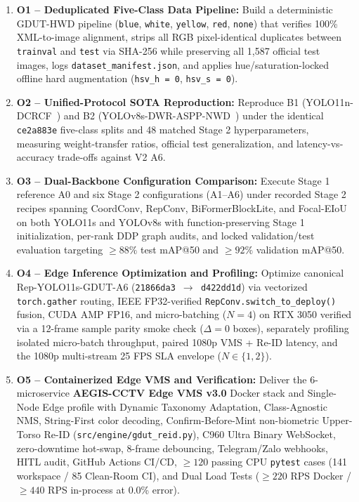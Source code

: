 \begin{enumerate}[leftmargin=1.9em, itemsep=2.5pt]
  \item \textbf{O1 -- Deduplicated Five-Class Data Pipeline:} Build a deterministic GDUT-HWD pipeline (\texttt{blue}, \texttt{white}, \texttt{yellow}, \texttt{red}, \texttt{none}) that verifies 100\% XML-to-image alignment, strips all RGB pixel-identical duplicates between \texttt{trainval} and \texttt{test} via SHA-256 while preserving all 1,587 official test images, logs \nolinkurl{dataset_manifest.json}, and applies hue/saturation-locked offline hard augmentation (\texttt{hsv\_h = 0}, \texttt{hsv\_s = 0}).
  \item \textbf{O2 -- Unified-Protocol SOTA Reproduction:} Reproduce B1 (YOLO11n-DCRCF~\cite{zhao2025yolodcrcf}) and B2 (YOLOv8s-DWR-ASPP-NWD~\cite{song2024improved}) under the identical \texttt{ce2a883e} five-class splits and 48 matched Stage 2 hyperparameters, measuring weight-transfer ratios, official test generalization, and latency-vs-accuracy trade-offs against V2 A6.
  \item \textbf{O3 -- Dual-Backbone Configuration Comparison:} Execute Stage 1 reference A0 and six Stage 2 configurations (A1--A6) under recorded Stage 2 recipes spanning CoordConv, RepConv, BiFormerBlockLite, and Focal-EIoU on both YOLO11s and YOLOv8s with function-preserving Stage 1 initialization, per-rank DDP graph audits, and locked validation/test evaluation targeting $\ge 88\%$ test mAP@50 and $\ge 92\%$ validation mAP@50.
  \item \textbf{O4 -- Edge Inference Optimization and Profiling:} Optimize canonical Rep-YOLO11s-GDUT-A6 (\texttt{21866da3 $\to$ d422dd1d}) via vectorized \texttt{torch.gather} routing, IEEE FP32-verified \nolinkurl{RepConv.switch_to_deploy()} fusion, CUDA AMP FP16, and micro-batching ($N=4$) on RTX 3050 verified via a 12-frame sample parity smoke check ($\Delta = 0$ boxes), separately profiling isolated micro-batch throughput, paired 1080p VMS + Re-ID latency, and the 1080p multi-stream 25 FPS SLA envelope ($N \in \{1, 2\}$).
  \item \textbf{O5 -- Containerized Edge VMS and Verification:} Deliver the 6-microservice \textbf{AEGIS-CCTV Edge VMS v3.0} Docker stack and Single-Node Edge profile with Dynamic Taxonomy Adaptation, Class-Agnostic NMS, String-First color decoding, Confirm-Before-Mint non-biometric Upper-Torso Re-ID (\nolinkurl{src/engine/gdut_reid.py}), C960 Ultra Binary WebSocket, zero-downtime hot-swap, 8-frame debouncing, Telegram/Zalo webhooks, HITL audit, GitHub Actions CI/CD, $\ge 120$ passing CPU \texttt{pytest} cases (141 workspace / 85 Clean-Room CI), and Dual Load Tests ($\ge 220$ RPS Docker / $\ge 440$ RPS in-process at 0.0\% error).
\end{enumerate}

